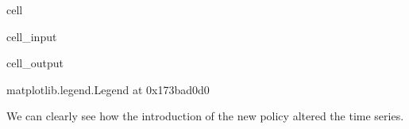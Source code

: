 \documentclass[letterpaper,10pt,english]{jupyterBook}
\begin{document}
\begin{sphinxuseclass}{cell}\begin{sphinxVerbatimInput}

\begin{sphinxuseclass}{cell_input}
\begin{sphinxVerbatim}[commandchars=\\\{\}]
   \PYG{p}{[}\PYG{p}{]}
     \PYG{p}{[} \PYG{p}{]} 
   
\end{sphinxVerbatim}

\end{sphinxuseclass}\end{sphinxVerbatimInput}
\begin{sphinxVerbatimOutput}

\begin{sphinxuseclass}{cell_output}
\begin{sphinxVerbatim}[commandchars=\\\{\}]
\PYGZlt{}matplotlib.legend.Legend at 0x173bad0d0\PYGZgt{}
\end{sphinxVerbatim}

\noindent{}

\end{sphinxuseclass}\end{sphinxVerbatimOutput}

\end{sphinxuseclass}
\sphinxAtStartPar
We can clearly see how the introduction of the new policy altered the time series.
\end{document}
